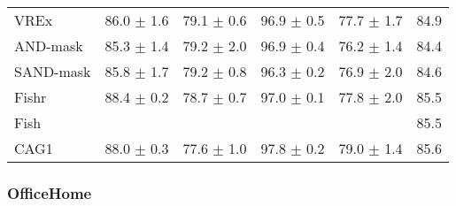 \documentclass{article}
\begin{document}
\begin{center}
{\begin{tabular}{lccccc}
VREx                 & 86.0 $\pm$ 1.6       & 79.1 $\pm$ 0.6       & 96.9 $\pm$ 0.5       & 77.7 $\pm$ 1.7       & 84.9                 \\
AND-mask             & 85.3 $\pm$ 1.4       & 79.2 $\pm$ 2.0       & 96.9 $\pm$ 0.4       & 76.2 $\pm$ 1.4       & 84.4                 \\
SAND-mask            & 85.8 $\pm$ 1.7       & 79.2 $\pm$ 0.8       & 96.3 $\pm$ 0.2       & 76.9 $\pm$ 2.0       & 84.6                 \\
Fishr                & 88.4 $\pm$ 0.2       & 78.7 $\pm$ 0.7       & 97.0 $\pm$ 0.1       & 77.8 $\pm$ 2.0       & 85.5                 \\
Fish                 &                      &                      &                      &                      & 85.5                 \\
\midrule
CAG1                 & 88.0 $\pm$ 0.3       & 77.6 $\pm$ 1.0       & 97.8 $\pm$ 0.2       & 79.0 $\pm$ 1.4       & 85.6                 \\
\bottomrule
\end{tabular}}
\end{center}

 

\subsubsection{OfficeHome}
\end{document}
